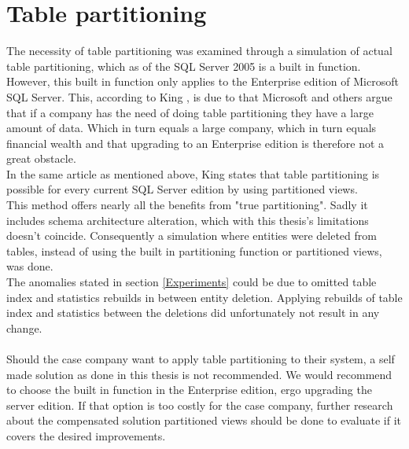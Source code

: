 \documentclass{cslthse-msc}
\begin{document}
\section{Table partitioning}
The necessity of table partitioning was examined through a simulation of actual table partitioning, which as of the SQL Server 2005 is a built in function. However, this built in function only applies to the Enterprise edition of Microsoft SQL Server. This, according to King \cite{partitionwoEnterprise}, is due to that Microsoft and others argue that if a company has the need of doing table partitioning they have a large amount of data. Which in turn equals a large company, which in turn equals financial wealth and that upgrading to an Enterprise edition is therefore not a great obstacle. \\ In the same article as mentioned above, King states that table partitioning is possible for every current SQL Server edition by using partitioned views.\\ This method offers nearly all the benefits from "true partitioning". Sadly it includes schema architecture alteration, which with this thesis's limitations doesn't coincide. Consequently a simulation where entities were deleted from tables, instead of using the built in partitioning function or partitioned views, was done.\\
The anomalies stated in section \ref{Experiments} could be due to omitted table index and statistics rebuilds in between entity deletion. Applying rebuilds of table index and statistics between the deletions did unfortunately not result in any change. \\\\
Should the case company want to apply table partitioning to their system, a self made solution as done in this thesis is not recommended. We would recommend to choose the built in function in the Enterprise edition, ergo upgrading the server edition. If that option is too costly for the case company, further research about the compensated solution partitioned views should be done to evaluate if it covers the desired improvements. 
\end{document}
